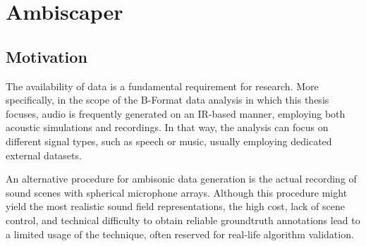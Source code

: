 

\section{Ambiscaper}


\subsection{Motivation}

The availability of data is a fundamental requirement for research. 
More specifically, in the scope of the B-Format data analysis in which this thesis focuses, audio is frequently generated on an IR-based manner, employing both acoustic simulations and recordings. 
 In that way, the analysis can focus on different signal types, such as speech or music, usually employing dedicated external datasets. 

An alternative procedure for ambisonic data generation is the actual recording of sound scenes with spherical microphone arrays. 
Although this procedure might yield the most realistic sound field representations, the high cost, lack of scene control, and technical difficulty to obtain reliable groundtruth annotations lead to a limited usage of the technique, often reserved for real-life algorithm validation. 
 


